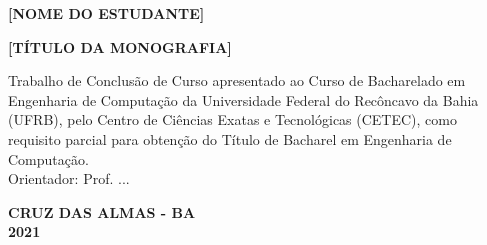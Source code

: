 \begin{titlepage}

\begin{center}
\textbf{[NOME DO ESTUDANTE]\\}
\vspace{7,5cm}

		\textbf{[TÍTULO DA MONOGRAFIA]}\\

\vspace{2.5cm}

\vspace{2cm}
\begin{flushright}
	\begin{minipage}[l]{8cm}
		Trabalho de Conclusão de Curso apresentado ao Curso de Bacharelado em Engenharia de Computação da Universidade Federal do Recôncavo da Bahia (UFRB), pelo Centro de Ciências Exatas e Tecnológicas (CETEC), como requisito parcial para obtenção do Título de Bacharel em Engenharia de Computação.\\
		Orientador: Prof. ...
	\end{minipage}
\end{flushright}

\end{center}

\vfill
\centering
		
			\textbf{CRUZ DAS ALMAS - BA \\2021}

\end{titlepage}




